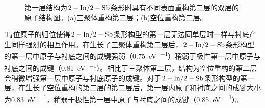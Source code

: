 \begin{figure}[htb]
    \caption{第一层结构为$\rm 2-In/2-Sb$条形时具有不同表面重构第二层的双层的原子结构图。(a)三聚体重构第二层；(b)空位重构第二层。}
    \label{fig:IS_structure_2Linsb_22strip}
\end{figure}

$\rm T_{4} \it$位原子的归位使得$\rm 2-In/2-Sb$条形构型的第一层无法同单层时一样与衬底产生同样强烈的相互作用。在生长了三聚体重构第二层后，$\rm 2-In/2-Sb$条形构型的第一层中原子与衬底之间的成键强弱（\SI{0.75}{\electronvolt\per\pair}）稍弱于极性第一层中原子与衬底之间的成键（\SI{0.81}{\electronvolt\per\pair}）。相比于三聚体第二层，结构为空位重构的第二层会稍微增强第一层中原子与衬底原子的成键。对于$\rm 2-In/2-Sb$条形构型的第一层，在生长了空位重构的第二层的第二层后，第一层内原子和衬底之间的成键大小为\SI{0.83}{\electronvolt\per\pair}，稍弱于极性第一层中原子与衬底之间的成键（\SI{0.85}{\electronvolt\per\pair}）。

